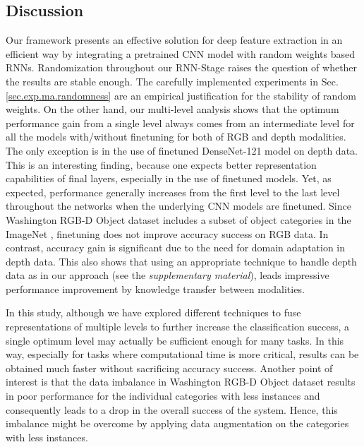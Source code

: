 \subsection{Discussion} \label{sec:exp.discussion}
Our framework presents an effective solution for deep feature extraction in an efficient way by integrating a pretrained CNN model with random weights based RNNs. Randomization throughout our RNN-Stage raises the question of whether the results are stable enough. The carefully implemented experiments in Sec. \ref{sec.exp.ma.randomness} are an empirical justification for the stability of random weights. On the other hand, our multi-level analysis shows that the optimum performance gain from a single level always comes from an intermediate level for all the models with/without finetuning for both of RGB and depth modalities. The only exception is in the use of finetuned DenseNet-121 model on depth data. This is an interesting finding, because one expects better representation capabilities of final layers, especially in the use of finetuned models. Yet, as expected, performance generally increases from the first level to the last level throughout the networks when the underlying CNN models are finetuned. Since Washington RGB-D Object \citep{Lai_ICRA_2011} dataset includes a subset of object categories in the ImageNet \citep{Deng_Imagenet_CVPR_2009}, finetuning does not improve accuracy success on RGB data. In contrast, accuracy gain is significant due to the need for domain adaptation in depth data. This also shows that using an appropriate technique to handle depth data as in our approach (see the \textit{supplementary material}), leads impressive performance improvement by knowledge transfer between modalities. 

In this study, although we have explored different techniques to fuse representations of multiple levels to further increase the classification success, a single optimum level may actually be sufficient enough for many tasks. In this way, especially for tasks where computational time is more critical, results can be obtained much faster without sacrificing accuracy success. Another point of interest is that the data imbalance in Washington RGB-D Object dataset results in poor performance for the individual categories with less instances and consequently leads to a drop in the overall success of the system. Hence, this imbalance might be overcome by applying data augmentation on the categories with less instances.

